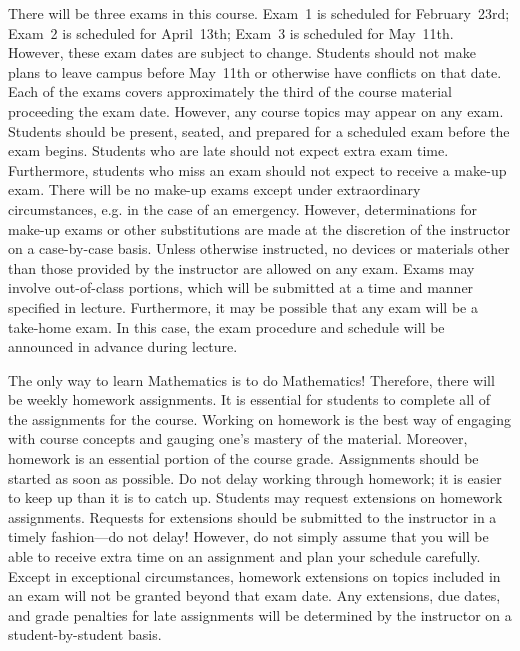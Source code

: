 \documentclass[11pt,letterpaper]{article}
\begin{document}
There will be three exams in this course. Exam~1 is scheduled for February~23rd; Exam~2 is scheduled for April~13th; Exam~3 is scheduled for May~11th. However, these exam dates are subject to change. Students should not make plans to leave campus before May~11th or otherwise have conflicts on that date. Each of the exams covers approximately the third of the course material proceeding the exam date. However, any course topics may appear on any exam. Students should be present, seated, and prepared for a scheduled exam before the exam begins. Students who are late should not expect extra exam time. Furthermore, students who miss an exam should not expect to receive a make-up exam. There will be no make-up exams except under extraordinary circumstances, e.g. in the case of an emergency. However, determinations for make-up exams or other substitutions are made at the discretion of the instructor on a case-by-case basis. Unless otherwise instructed, no devices or materials other than those provided by the instructor are allowed on any exam. Exams may involve out-of-class portions, which will be submitted at a time and manner specified in lecture. Furthermore, it may be possible that any exam will be a take-home exam. In this case, the exam procedure and schedule will be announced in advance during lecture. 
\sectionbreak



The only way to learn Mathematics is to do Mathematics! Therefore, there will be weekly homework assignments. It is essential for students to complete all of the assignments for the course. Working on homework is the best way of engaging with course concepts and gauging one's mastery of the material. Moreover, homework is an essential portion of the course grade. Assignments should be started as soon as possible. Do not delay working through homework; it is easier to keep up than it is to catch up. Students may request extensions on homework assignments. Requests for extensions should be submitted to the instructor in a timely fashion---do not delay! However, do not simply assume that you will be able to receive extra time on an assignment and plan your schedule carefully. Except in exceptional circumstances, homework extensions on topics included in an exam will not be granted beyond that exam date. Any extensions, due dates, and grade penalties for late assignments will be determined by the instructor on a student-by-student basis. \pspace
\end{document}
